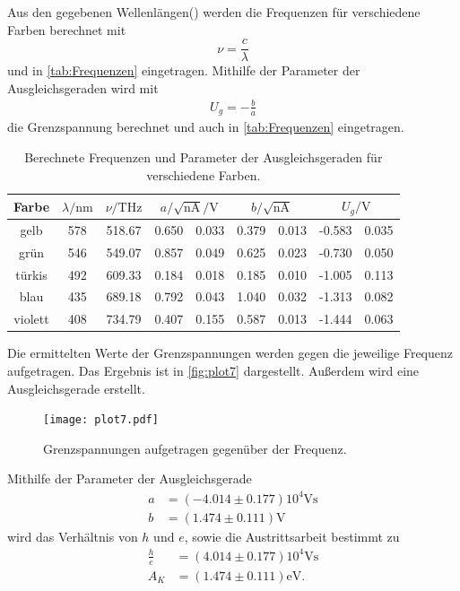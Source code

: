 Aus den gegebenen Wellenlängen(\cite[80]{V500}) werden die Frequenzen für verschiedene Farben berechnet mit
\begin{equation}
  \nu = \frac{c}{\lambda}
\end{equation} 
und in \autoref{tab:Frequenzen} eingetragen.
Mithilfe der Parameter der Ausgleichsgeraden wird mit
\begin{align*}
  U_g = - \frac{b}{a}
\end{align*}
die Grenzspannung berechnet und auch in \autoref{tab:Frequenzen} eingetragen.
\begin{table}[H]
  \centering
  \caption{Berechnete Frequenzen und Parameter der Ausgleichsgeraden für verschiedene Farben.}
  \label{tab:Frequenzen}
  \begin{tabular}{c S[table-format=3.0] S[table-format=3.2] S@{${}\pm{}$} S S@{${}\pm{}$} S S[table-format=3.3]@{${}\pm{}$} S }
  \toprule
  {Farbe} & {$\lambda / \si{\nano\metre}$} & {$\nu / \si{\tera\hertz}$} & &  &  \\
  \midrule
    gelb    & 578 & 518.67 & 0.650 & 0.033 & 0.379 & 0.013 & -0.583 & 0.035 \\
    grün    & 546 & 549.07 & 0.857 & 0.049 & 0.625 & 0.023 & -0.730 & 0.050 \\
    türkis  & 492 & 609.33 & 0.184 & 0.018 & 0.185 & 0.010 & -1.005 & 0.113 \\
    blau    & 435 & 689.18 & 0.792 & 0.043 & 1.040 & 0.032 & -1.313 & 0.082 \\
    violett & 408 & 734.79 & 0.407 & 0.155 & 0.587 & 0.013 & -1.444 & 0.063 \\
  \bottomrule
  \end{tabular}
\end{table}

Die ermittelten Werte der Grenzspannungen werden gegen die jeweilige Frequenz aufgetragen.
Das Ergebnis ist in \autoref{fig:plot7} dargestellt.
Außerdem wird eine Ausgleichsgerade erstellt.
\begin{figure}[H]
  \centering
  \texttt{[image: plot7.pdf]}
  \caption{Grenzspannungen aufgetragen gegenüber der Frequenz.}
  \label{fig:plot7}
\end{figure}

Mithilfe der Parameter der Ausgleichsgerade
\begin{align*}
  a &= (-4.014 \pm 0.177) 10^4 \si{\volt\second} \\
  b &= (1.474 \pm 0.111) \si{\volt}
\end{align*}
wird das Verhältnis von $h$ und $e$, sowie die Austrittsarbeit bestimmt zu
\begin{align*}
  \frac{h}{e} &= (4.014 \pm 0.177) 10^4 \si{\volt\second} \\
  A_K &=  (1.474 \pm 0.111) \si{\electronvolt}.
\end{align*}

